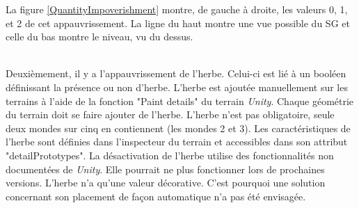 		La figure \ref{QuantityImpoverishment} montre, de gauche à droite, les valeurs 0, 1, et 2 de cet appauvrissement. La ligne du haut montre une vue possible du SG et celle du bas montre le niveau, vu du dessus.\medskip
		
		\begin{minipage}{\linewidth}
			\label{QuantityImpoverishment}
		\end{minipage}\medskip
		\\
		
		Deuxièmement, il y a l'appauvrissement de l'herbe. Celui-ci est lié à un booléen définissant la présence ou non d'herbe. L'herbe est ajoutée manuellement sur les terrains à l'aide de la fonction "Paint details" du terrain \textit{Unity}. Chaque géométrie du terrain doit se faire ajouter de l'herbe. L'herbe n'est pas obligatoire, seule deux mondes sur cinq en contiennent (les mondes 2 et 3). Les caractéristiques de l'herbe sont définies dans l'inspecteur du terrain et accessibles dans son attribut "detailPrototypes". La désactivation de l'herbe utilise des fonctionnalités non documentées de \textit{Unity}. Elle pourrait ne plus fonctionner lors de prochaines versions. L'herbe n'a qu'une valeur décorative. C'est pourquoi une solution concernant son placement de façon automatique n'a pas été envisagée.
		
